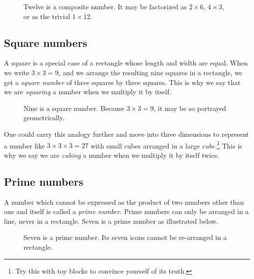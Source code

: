 \documentclass[
  a4paper,
]{article}
\begin{document}
\begin{figure}
\hypertarget{fig:six-by-two}{%
\centering

\caption{Twelve is a composite number. It may be factorized as
\(2 \times 6\), \(4 \times 3\), or as the trivial
\(1 \times 12\).}\label{fig:six-by-two}
}
\end{figure}

\hypertarget{square-numbers}{%
\subsection{Square numbers}\label{square-numbers}}

A square is a special case of a rectangle whose length and width are
equal. When we write \(3 \times 3 = 9\), and we arrange the resulting
nine squares in a rectangle, we get a \emph{square number} of three
squares by three squares. This is why we say that we are \emph{squaring}
a number when we multiply it by itself.

\begin{figure}
\hypertarget{fig:three-square}{%
\centering

\caption{Nine is a square number. Because \(3 \times 3 = 9\), it may be
so portrayed geometrically.}\label{fig:three-square}
}
\end{figure}

One could carry this analogy further and move into three dimensions to
represent a number like \(3 \times 3 \times 3 = 27\) with small cubes
arranged in a large \emph{cube.}\footnote{Try this with toy blocks to
  convince yourself of its truth.} This is why we say we are
\emph{cubing} a number when we multiply it by itself twice.

\hypertarget{prime-numbers}{%
\subsection{Prime numbers}\label{prime-numbers}}

A number which cannot be expressed as the product of two numbers other
than one and itself is called a \emph{prime number}. Prime numbers can
only be arranged in a line, never in a rectangle. Seven is a prime
number as illustrated below.

\begin{figure}
\hypertarget{fig:seven}{%
\centering

\caption{Seven is a prime number. Its seven icons cannot be re-arranged
in a rectangle.}\label{fig:seven}
}
\end{figure}
\end{document}
